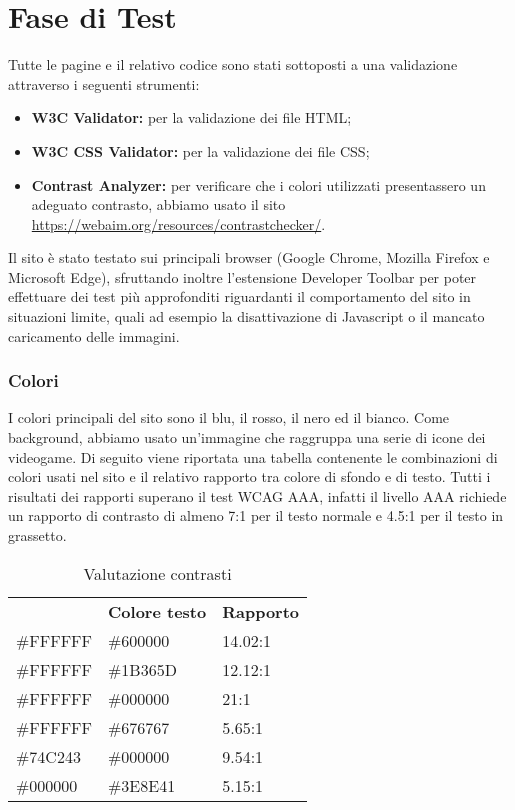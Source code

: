 \section{Fase di Test}
Tutte le pagine e il relativo codice sono stati sottoposti a una validazione attraverso i seguenti strumenti:
\begin{itemize}
	\item \textbf{W3C Validator:} per la validazione dei file HTML;
	\item \textbf{W3C CSS Validator:} per la validazione dei file CSS;
	\item \textbf{Contrast Analyzer:} per verificare che i colori utilizzati presentassero un adeguato contrasto, abbiamo usato il sito \url{https://webaim.org/resources/contrastchecker/}.
\end{itemize}
Il sito è stato testato sui principali browser (Google Chrome, Mozilla Firefox e Microsoft Edge), sfruttando inoltre l'estensione Developer Toolbar per poter effettuare 
dei test più approfonditi riguardanti il comportamento del sito in situazioni limite, quali ad esempio la disattivazione di Javascript o il mancato caricamento delle immagini.

\subsubsection{Colori}
I colori principali del sito sono il blu, il rosso, il nero ed il bianco. Come background, abbiamo usato un’immagine che raggruppa una serie di icone dei videogame. Di seguito viene riportata una tabella contenente le combinazioni di colori usati nel sito e il relativo rapporto tra colore di sfondo e di testo. Tutti i risultati dei rapporti superano il test WCAG AAA, infatti il livello AAA richiede un rapporto di contrasto di almeno 7:1 per il testo normale e 4.5:1 per il testo in grassetto.

\begin{center}
	\renewcommand{\arraystretch}{1.8}
	\begin{longtable}[H]{| p{.18\hsize} | p{.18\hsize} | p{.18\hsize} |}
		\caption{Valutazione contrasti}\\
		\rowcolor[HTML]{C14638}
		\multicolumn{1}{c}{\color[HTML]{FFFFFF} \textbf{Colore sfondo}} &
		\multicolumn{1}{c}{\color[HTML]{FFFFFF} \textbf{Colore testo}} &
		\multicolumn{1}{c}{\color[HTML]{FFFFFF} \textbf{Rapporto}} \\
		
		\#FFFFFF & \#600000 & 14.02:1 \\
		\hline
		\#FFFFFF & \#1B365D & 12.12:1 \\
		\hline
		\#FFFFFF & \#000000 & 21:1 \\
		\hline
		\#FFFFFF & \#676767 & 5.65:1 \\
		\hline
		\#74C243 & \#000000 & 9.54:1 \\
		\hline
		\#000000 & \#3E8E41 & 5.15:1 \\
		\hline
	\end{longtable}
\end{center}

